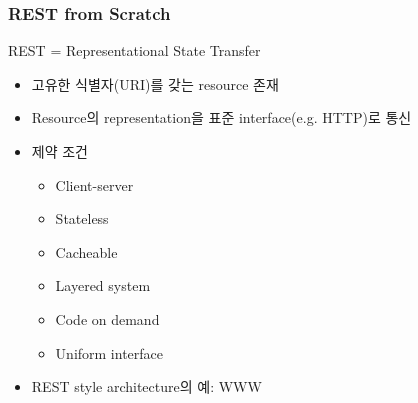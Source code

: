 \begin{frame}[fragile]
\frametitle{REST from Scratch}

\begin{center}
REST = Representational State Transfer
\end{center}

\begin{itemize}
\item 고유한 식별자(URI)를 갖는 resource 존재
\item Resource의 representation을 표준 interface(e.g. HTTP)로 통신
\item 제약 조건
\begin{itemize}
\item Client-server
\item Stateless
\item Cacheable
\item Layered system
\item Code on demand
\item Uniform interface
\end{itemize}
\item REST style architecture의 예: WWW
\end{itemize}

\end{frame}

